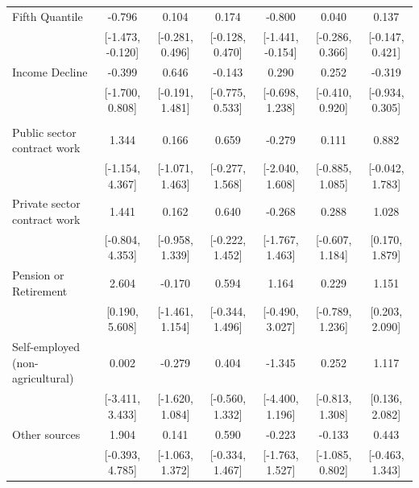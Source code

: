 \documentclass[
  10,
  letterpaper,
  DIV=11,
  numbers=noendperiod]{scrartcl}
\begin{document}
\begin{table}
\begin{tabular}[t]{lcccccc}
\hspace{1em}Fifth Quantile & -0.796 & 0.104 & 0.174 & -0.800 & 0.040 & 0.137\\
\hspace{1em} & {}[-1.473, -0.120] & {}[-0.281, 0.496] & {}[-0.128, 0.470] & {}[-1.441, -0.154] & {}[-0.286, 0.366] & {}[-0.147, 0.421]\\
\hspace{1em}Income Decline & -0.399 & 0.646 & -0.143 & 0.290 & 0.252 & -0.319\\
\hspace{1em} & {}[-1.700, 0.808] & {}[-0.191, 1.481] & {}[-0.775, 0.533] & {}[-0.698, 1.238] & {}[-0.410, 0.920] & {}[-0.934, 0.305]\\
\addlinespace[0.3em]
\multicolumn{7}{l}{\cellcolor[HTML]{3498DB}{\textbf{Income Source}}}\\
\hspace{1em}Public sector contract work & 1.344 & 0.166 & 0.659 & -0.279 & 0.111 & 0.882\\
\hspace{1em} & {}[-1.154, 4.367] & {}[-1.071, 1.463] & {}[-0.277, 1.568] & {}[-2.040, 1.608] & {}[-0.885, 1.085] & {}[-0.042, 1.783]\\
\hspace{1em}Private sector contract work & 1.441 & 0.162 & 0.640 & -0.268 & 0.288 & 1.028\\
\hspace{1em} & {}[-0.804, 4.353] & {}[-0.958, 1.339] & {}[-0.222, 1.452] & {}[-1.767, 1.463] & {}[-0.607, 1.184] & {}[0.170, 1.879]\\
\hspace{1em}Pension or Retirement & 2.604 & -0.170 & 0.594 & 1.164 & 0.229 & 1.151\\
\hspace{1em} & {}[0.190, 5.608] & {}[-1.461, 1.154] & {}[-0.344, 1.496] & {}[-0.490, 3.027] & {}[-0.789, 1.236] & {}[0.203, 2.090]\\
\hspace{1em}Self-employed (non-agricultural) & 0.002 & -0.279 & 0.404 & -1.345 & 0.252 & 1.117\\
\hspace{1em} & {}[-3.411, 3.433] & {}[-1.620, 1.084] & {}[-0.560, 1.332] & {}[-4.400, 1.196] & {}[-0.813, 1.308] & {}[0.136, 2.082]\\
\hspace{1em}Other sources & 1.904 & 0.141 & 0.590 & -0.223 & -0.133 & 0.443\\
\hspace{1em} & {}[-0.393, 4.785] & {}[-1.063, 1.372] & {}[-0.334, 1.467] & {}[-1.763, 1.527] & {}[-1.085, 0.802] & {}[-0.463, 1.343]\\

\end{tabular}
\end{table}
\end{document}
